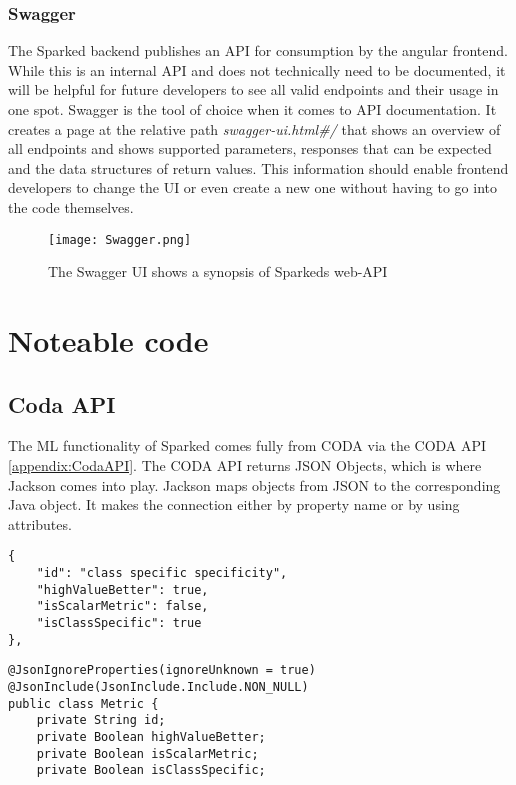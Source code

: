\subsubsection{Swagger}
The Sparked backend publishes an API for consumption by the angular frontend. While this is an internal API and does not technically need to be documented, it will be helpful for future developers to see all valid endpoints and their usage in one spot. Swagger is the tool of choice when it comes to API documentation. It creates a page at the relative path \textit{\/swagger-ui.html\#/} that shows an overview of all endpoints and shows supported parameters, responses that can be expected and the data structures of return values. This information should enable frontend developers to change the UI or even create a new one without having to go into the code themselves. 

\begin{figure}
	\texttt{[image: Swagger.png]}
	\caption{The Swagger UI shows a synopsis of Sparkeds web-API}
\end{figure}


\section{Noteable code}
\subsection{Coda API}
The ML functionality of Sparked comes fully from CODA via the CODA API \ref{appendix:CodaAPI}. The CODA API returns JSON Objects, which is where Jackson comes into play. Jackson maps objects from JSON to the corresponding Java object. It makes the connection either by property name or by using attributes.

\begin{lstlisting}[caption={Metric returned by the CODA API in Json format.},captionpos=b]
{
	"id": "class specific specificity",
	"highValueBetter": true,
	"isScalarMetric": false,
	"isClassSpecific": true
},
\end{lstlisting}

\begin{lstlisting}[caption={Metric class in Sparked. The fields match the Json fields.},captionpos=b]
@JsonIgnoreProperties(ignoreUnknown = true)
@JsonInclude(JsonInclude.Include.NON_NULL)
public class Metric {
    private String id;
    private Boolean highValueBetter;
    private Boolean isScalarMetric;
    private Boolean isClassSpecific;
\end{lstlisting}

